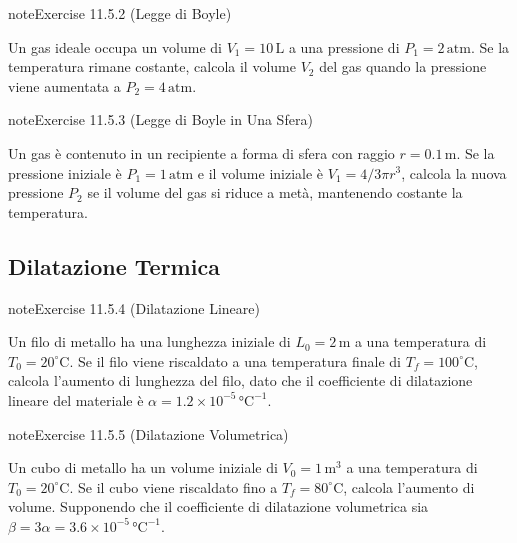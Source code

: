 \documentclass[letterpaper,10pt,italian]{jupyterBook}
\begin{document}
\begin{sphinxadmonition}{note}{Exercise 11.5.2 (Legge di Boyle)}



\sphinxAtStartPar
Un gas ideale occupa un volume di \(V_1 = 10 \, \text{L}\) a una pressione di \(P_1 = 2 \, \text{atm}\). Se la temperatura rimane costante, calcola il volume \(V_2\) del gas quando la pressione viene aumentata a \(P_2 = 4 \, \text{atm}\).
\end{sphinxadmonition}
 \label{exercise:ch/thermodynamics/foundation-problems-exercise-2}

\begin{sphinxadmonition}{note}{Exercise 11.5.3 (Legge di Boyle in Una Sfera)}



\sphinxAtStartPar
Un gas è contenuto in un recipiente a forma di sfera con raggio \(r = 0.1 \, \text{m}\). Se la pressione iniziale è \(P_1 = 1 \, \text{atm}\) e il volume iniziale è \(V_1 = 4/3 \pi r^3\), calcola la nuova pressione \(P_2\) se il volume del gas si riduce a metà, mantenendo costante la temperatura.
\end{sphinxadmonition}


\subsection{Dilatazione Termica}
\label{\detokenize{ch/thermodynamics/foundation-problems:dilatazione-termica}} \label{exercise:ch/thermodynamics/foundation-problems-exercise-3}

\begin{sphinxadmonition}{note}{Exercise 11.5.4 (Dilatazione Lineare)}



\sphinxAtStartPar
Un filo di metallo ha una lunghezza iniziale di \(L_0 = 2 \, \text{m}\) a una temperatura di \(T_0 = 20^\circ \text{C}\). Se il filo viene riscaldato a una temperatura finale di \(T_f = 100^\circ \text{C}\), calcola l’aumento di lunghezza del filo, dato che il coefficiente di dilatazione lineare del materiale è \(\alpha = 1.2 \times 10^{-5} \, \text{°C}^{-1}\).
\end{sphinxadmonition}
 \label{exercise:ch/thermodynamics/foundation-problems-exercise-4}

\begin{sphinxadmonition}{note}{Exercise 11.5.5 (Dilatazione Volumetrica)}



\sphinxAtStartPar
Un cubo di metallo ha un volume iniziale di \(V_0 = 1 \, \text{m}^3\) a una temperatura di \(T_0 = 20^\circ \text{C}\). Se il cubo viene riscaldato fino a \(T_f = 80^\circ \text{C}\), calcola l’aumento di volume. Supponendo che il coefficiente di dilatazione volumetrica sia \(\beta = 3 \alpha = 3.6 \times 10^{-5} \, \text{°C}^{-1}\).
\end{sphinxadmonition}
 \label{exercise:ch/thermodynamics/foundation-problems-exercise-5}
\end{document}
